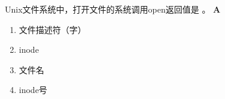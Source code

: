 \begin{problem}
	Unix文件系统中，打开文件的系统调用open返回值是 \myline。
	\textbf{A}
	\vspace{-0.5em}
	\begin{multicols}{4}
		\begin{enumerate}[label=\Alph*.]
			\item 文件描述符（字）
			\item inode
			\item 文件名
			\item inode号
		\end{enumerate}
	\end{multicols}
	\vspace{-1em}
\end{problem}
